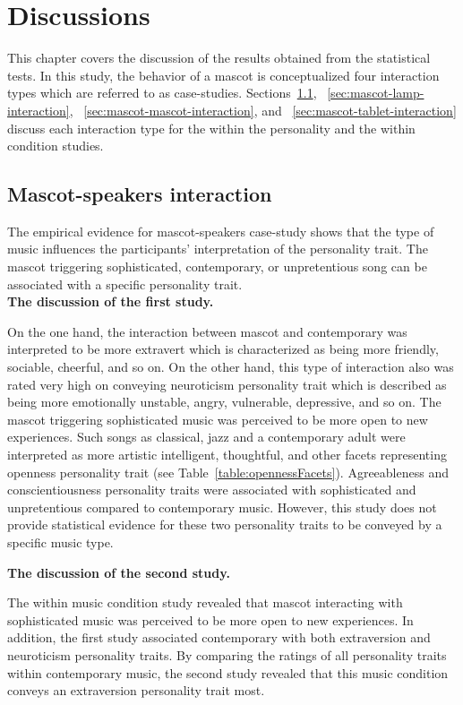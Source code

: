 \chapter{Discussions}
\label{ch:discussions}
This chapter covers the discussion of the results obtained from the statistical tests.
In this study, the behavior of a mascot is conceptualized four interaction types which are referred to as case-studies.
Sections~\ref{sec:mascot-speakers-interaction}, ~\ref{sec:mascot-lamp-interaction},
~\ref{sec:mascot-mascot-interaction}, and ~\ref{sec:mascot-tablet-interaction} discuss each interaction type for the
within the personality and the within condition studies.

\section{Mascot-speakers interaction}
\label{sec:mascot-speakers-interaction}
The empirical evidence for mascot-speakers case-study shows that the type of music influences the participants'
interpretation of the personality trait.
The mascot triggering sophisticated, contemporary, or unpretentious song can be associated
with a specific personality trait. \\

\textbf{The discussion of the first study.}\par
On the one hand, the interaction between mascot and contemporary was interpreted
to be more extravert which is characterized as being more friendly,
sociable, cheerful, and so on.
On the other hand, this type of interaction also was rated very high on conveying
neuroticism personality trait which is described as being more emotionally unstable,
angry, vulnerable, depressive, and so on.
The mascot triggering sophisticated music was perceived to be more open to new experiences.
Such songs as classical, jazz and a contemporary adult were interpreted as more artistic intelligent,
thoughtful, and other facets representing openness personality trait (see Table~\ref{table:opennessFacets}).
Agreeableness and conscientiousness personality traits were associated with sophisticated and
unpretentious compared to contemporary music.
However, this study does not provide statistical evidence for these two personality traits to be
conveyed by a specific music type.

\textbf{The discussion of the second study.}\par
The within music condition study revealed that mascot interacting with sophisticated music
was perceived to be more open to new experiences.
In addition, the first study associated contemporary with both extraversion and neuroticism personality traits.
By comparing the ratings of all personality traits within contemporary music, the second study revealed that this
music condition conveys an extraversion personality trait most.


